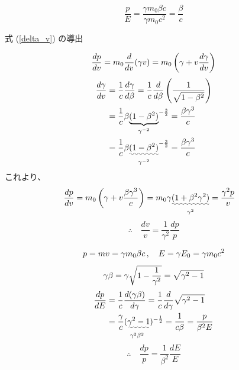 \documentclass[10pt,a4paper]{ltjsarticle}
\begin{document}
\begin{equation}
    \frac{p}{E} = \frac{\gamma m_0 \beta c}{\gamma m_0 c^2} = \frac{\beta}{c}
\end{equation}

式 (\ref{delta_v}) の導出

\begin{equation}
    \frac{dp}{dv} = m_0\frac{d}{dv}(\gamma v)
    = m_0 \left(\gamma + v \frac{d\gamma}{dv}\right) \notag
\end{equation}
%
\begin{align}
    \frac{d\gamma}{dv} & = \frac{1}{c}\frac{d\gamma}{d\beta}= \frac{1}{c}\frac{d}{d\beta}\left(\frac{1}{\sqrt{1-\beta^2}}\right) \notag \\
    & = \frac{1}{c} \beta \underset{\gamma^{-2}}{\underbrace{(1-\beta^2)}}^{-\frac{3}{2}} = \frac{\beta \gamma^3}{c} \notag \\
    & = \frac{1}{c} \beta \underset{\gamma^{-2}}{\uwave{(1-\beta^2)}}^{-\frac{3}{2}} = \frac{\beta \gamma^3}{c} \notag
\end{align}
%
これより、
\begin{align}
    \frac{dp}{dv} & = m_0 \left(\gamma + v \frac{\beta \gamma^3}{c}\right)
    = m_0 \gamma \underset{\gamma^2}{\uwave{(1 + \beta^2 \gamma^2)}}
    = \frac{\gamma^2 p}{v} \notag
\end{align}
%
\begin{equation}
    \therefore \quad \frac{dv}{v} = \frac{1}{\gamma^2}\frac{dp}{p}
    \label{dv_dp}
\end{equation}

\begin{align}
    p = mv = \gamma m_0 \beta c\,  , \quad E = \gamma E_0 = \gamma m_0 c^2 \notag
\end{align}
%
\begin{equation}
    \gamma \beta = \gamma \sqrt{1-\frac{1}{\gamma^2}} \notag = \sqrt{\gamma^2 -1} \notag
\end{equation}
%
\begin{align}
    \frac{dp}{dE} & = \frac{1}{c}\frac{d(\gamma \beta)}{d\gamma} = \frac{1}{c}\frac{d}{d\gamma}\sqrt{\gamma^2 -1} \notag \\
    & = \frac{\gamma}{c} \underset{\gamma^2\beta^2}{(\uwave{\gamma^2 -1}})^{-\frac{1}{2}} = \frac{1}{c\beta}
    = \frac{p}{\beta^2 E}\notag
\end{align}
%
\begin{equation}
    \therefore \quad \frac{dp}{p} = \frac{1}{\beta^2}\frac{dE}{E}
\end{equation}
\end{document}
